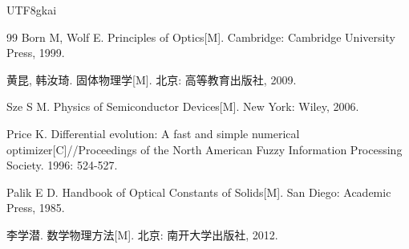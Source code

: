 \documentclass[12pt,a4paper]{article}
\begin{document}
\begin{CJK}{UTF8}{gkai}
\begin{thebibliography}{99}
 Born M, Wolf E. Principles of Optics[M]. Cambridge: Cambridge University Press, 1999.

 黄昆, 韩汝琦. 固体物理学[M]. 北京: 高等教育出版社, 2009.

 Sze S M. Physics of Semiconductor Devices[M]. New York: Wiley, 2006.

 Price K. Differential evolution: A fast and simple numerical optimizer[C]//Proceedings of the North American Fuzzy Information Processing Society. 1996: 524-527.

 Palik E D. Handbook of Optical Constants of Solids[M]. San Diego: Academic Press, 1985.

 李学潜. 数学物理方法[M]. 北京: 南开大学出版社, 2012.

\end{thebibliography}

\end{CJK}
\end{document}
